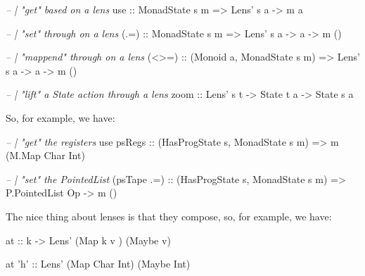 \documentclass[]{article}
\newenvironment{Shaded}{}{}
\newcommand{\DataTypeTok}[1]{\textcolor[rgb]{0.56,0.13,0.00}{#1}}
\newcommand{\CharTok}[1]{\textcolor[rgb]{0.25,0.44,0.63}{#1}}
\newcommand{\CommentTok}[1]{\textcolor[rgb]{0.38,0.63,0.69}{\textit{#1}}}
\newcommand{\OtherTok}[1]{\textcolor[rgb]{0.00,0.44,0.13}{#1}}
\newcommand{\FunctionTok}[1]{\textcolor[rgb]{0.02,0.16,0.49}{#1}}
\newcommand{\NormalTok}[1]{#1}
\begin{document}
\begin{Shaded}
\begin{Highlighting}[]
\CommentTok{-- | "get" based on a lens}
\OtherTok{use   ::} \DataTypeTok{MonadState}\NormalTok{ s m }\OtherTok{=>} \DataTypeTok{Lens'}\NormalTok{ s a }\OtherTok{->}\NormalTok{ m a}

\CommentTok{-- | "set" through on a lens}
\OtherTok{(.=)  ::} \DataTypeTok{MonadState}\NormalTok{ s m }\OtherTok{=>} \DataTypeTok{Lens'}\NormalTok{ s a }\OtherTok{->}\NormalTok{ a }\OtherTok{->}\NormalTok{ m ()}

\CommentTok{-- | "mappend" through on a lens}
\OtherTok{(<>=) ::}\NormalTok{ (}\DataTypeTok{Monoid}\NormalTok{ a, }\DataTypeTok{MonadState}\NormalTok{ s m) }\OtherTok{=>} \DataTypeTok{Lens'}\NormalTok{ s a }\OtherTok{->}\NormalTok{ a }\OtherTok{->}\NormalTok{ m ()}

\CommentTok{-- | "lift" a State action through a lens}
\OtherTok{zoom  ::} \DataTypeTok{Lens'}\NormalTok{ s t }\OtherTok{->} \DataTypeTok{State}\NormalTok{ t a }\OtherTok{->} \DataTypeTok{State}\NormalTok{ s a}
\end{Highlighting}
\end{Shaded}

So, for example, we have:

\begin{Shaded}
\begin{Highlighting}[]
\CommentTok{-- | "get" the registers}
\NormalTok{use}\OtherTok{ psRegs  ::}\NormalTok{ (}\DataTypeTok{HasProgState}\NormalTok{ s, }\DataTypeTok{MonadState}\NormalTok{ s m) }\OtherTok{=>}\NormalTok{ m (}\DataTypeTok{M.Map} \DataTypeTok{Char} \DataTypeTok{Int}\NormalTok{)}

\CommentTok{-- | "set" the PointedList}
\NormalTok{(psTape }\FunctionTok{.=}\NormalTok{)}\OtherTok{ ::}\NormalTok{ (}\DataTypeTok{HasProgState}\NormalTok{ s, }\DataTypeTok{MonadState}\NormalTok{ s m) }\OtherTok{=>} \DataTypeTok{P.PointedList} \DataTypeTok{Op} \OtherTok{->}\NormalTok{ m ()}
\end{Highlighting}
\end{Shaded}

The nice thing about lenses is that they compose, so, for example, we have:

\begin{Shaded}
\begin{Highlighting}[]
\OtherTok{at ::}\NormalTok{ k }\OtherTok{->} \DataTypeTok{Lens'}\NormalTok{ (}\DataTypeTok{Map}\NormalTok{ k    v  ) (}\DataTypeTok{Maybe}\NormalTok{ v)}

\NormalTok{at }\CharTok{'h'}\OtherTok{  ::} \DataTypeTok{Lens'}\NormalTok{ (}\DataTypeTok{Map} \DataTypeTok{Char} \DataTypeTok{Int}\NormalTok{) (}\DataTypeTok{Maybe} \DataTypeTok{Int}\NormalTok{)}
\end{Highlighting}
\end{Shaded}
\end{document}
